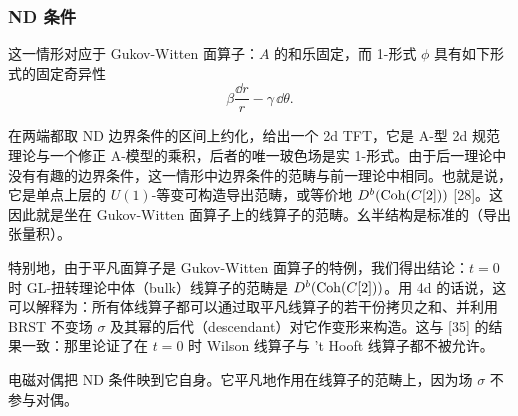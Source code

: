 
\subsubsection{ND 条件}

这一情形对应于 Gukov-Witten 面算子：$A$ 的和乐固定，而 1-形式 $\phi$ 具有如下形式的固定奇异性
\[
  \beta\frac{\dd r}{r}-\gamma\,\dd\theta.
\]

在两端都取 ND 边界条件的区间上约化，给出一个 2d TFT，它是 A-型 2d 规范理论与一个修正 A-模型的乘积，后者的唯一玻色场是实 1-形式。由于后一理论中没有有趣的边界条件，这一情形中边界条件的范畴与前一理论中相同。也就是说，它是单点上层的 $U(1)$-等变可构造导出范畴，或等价地 $D^b(\mathrm{Coh}(C[2]))$ [28]。这因此就是坐在 Gukov-Witten 面算子上的线算子的范畴。幺半结构是标准的（导出张量积）。

特别地，由于平凡面算子是 Gukov-Witten 面算子的特例，我们得出结论：$t=0$ 时 GL-扭转理论中体（bulk）线算子的范畴是 $D^b(\mathrm{Coh}(C[2]))$。用 4d 的话说，这可以解释为：所有体线算子都可以通过取平凡线算子的若干份拷贝之和、并利用 BRST 不变场 $\sigma$ 及其幂的后代（descendant）对它作变形来构造。这与 [35] 的结果一致：那里论证了在 $t=0$ 时 Wilson 线算子与 't Hooft 线算子都不被允许。

电磁对偶把 ND 条件映到它自身。它平凡地作用在线算子的范畴上，因为场 $\sigma$ 不参与对偶。

